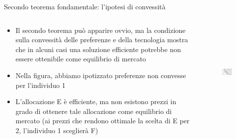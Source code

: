 \documentclass[aspectratio=149,11pt]{beamer}
\begin{document}
\begin{frame}{Secondo teorema fondamentale: l'ipotesi di convessità}
\begin{columns}
\begin{column}{.45\columnwidth}
\small
\begin{itemize}
\item Il secondo teorema può apparire ovvio, ma la condizione sulla convessità delle preferenze e della tecnologia mostra che in alcuni casi una soluzione efficiente potrebbe non essere ottenibile come equilibrio di mercato
\item Nella figura, abbiamo ipotizzato preferenze non convesse per l’individuo 1
\item L’allocazione E è efficiente, ma non esistono prezzi in grado di ottenere tale allocazione come equilibrio di mercato (ai prezzi che rendono ottimale la scelta di E per 2, l’individuo 1 sceglierà F)
\end{itemize}
\end{column}

\begin{column}{.55\columnwidth}
\begin{figure}
\centering
\includegraphics[height=5cm]{./figure/edgeworth-7.pdf}
\end{figure}
\end{column}
\end{columns}
\end{frame}
\end{document}
